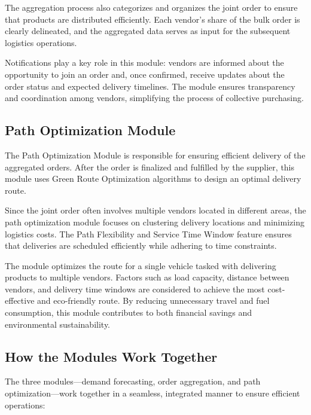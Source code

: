 The aggregation process also categorizes and organizes the joint order to ensure that products are distributed efficiently. Each vendor's share of the bulk order is clearly delineated, and the aggregated data serves as input for the subsequent logistics operations.

Notifications play a key role in this module: vendors are informed about the opportunity to join an order and, once confirmed, receive updates about the order status and expected delivery timelines. The module ensures transparency and coordination among vendors, simplifying the process of collective purchasing.

\subsection{Path Optimization Module}

The Path Optimization Module is responsible for ensuring efficient delivery of the aggregated orders. After the order is finalized and fulfilled by the supplier, this module uses Green Route Optimization algorithms to design an optimal delivery route.

Since the joint order often involves multiple vendors located in different areas, the path optimization module focuses on clustering delivery locations and minimizing logistics costs. The Path Flexibility and Service Time Window feature ensures that deliveries are scheduled efficiently while adhering to time constraints.

The module optimizes the route for a single vehicle tasked with delivering products to multiple vendors. Factors such as load capacity, distance between vendors, and delivery time windows are considered to achieve the most cost-effective and eco-friendly route. By reducing unnecessary travel and fuel consumption, this module contributes to both financial savings and environmental sustainability.

\subsection{How the Modules Work Together}

The three modules—demand forecasting, order aggregation, and path optimization—work together in a seamless, integrated manner to ensure efficient operations:

